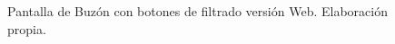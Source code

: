 \begin{figure}[htp]
\centering
  \quad
\caption{Pantalla de Buzón con botones de filtrado versión Web. Elaboración propia.}\label{fig:pantallaMultiWeb}
\end{figure}


